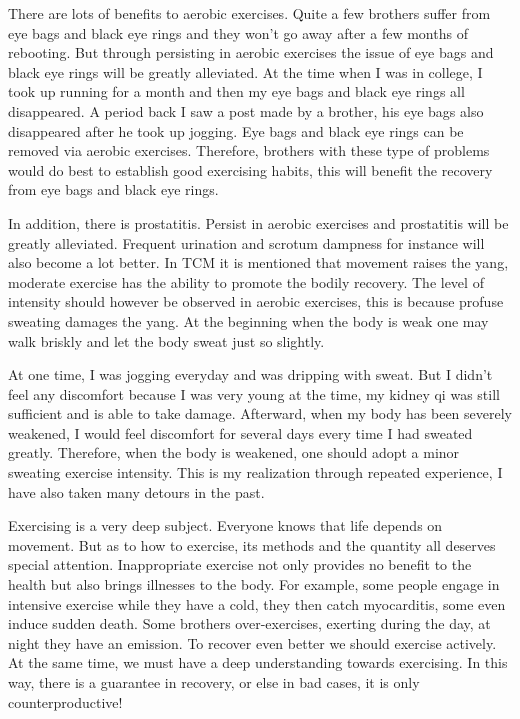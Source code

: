 \documentclass[
]{book}
\begin{document}
There are lots of benefits to aerobic exercises. Quite a few brothers suffer from eye bags and black eye rings and they won't go away after a few months of rebooting. But through persisting in aerobic exercises the issue of eye bags and black eye rings will be greatly alleviated. At the time when I was in college, I took up running for a month and then my eye bags and black eye rings all disappeared. A period back I saw a post made by a brother, his eye bags also disappeared after he took up jogging. Eye bags and black eye rings can be removed via aerobic exercises. Therefore, brothers with these type of problems would do best to establish good exercising habits, this will benefit the recovery from eye bags and black eye rings.

In addition, there is prostatitis. Persist in aerobic exercises and prostatitis will be greatly alleviated. Frequent urination and scrotum dampness for instance will also become a lot better. In TCM it is mentioned that movement raises the yang, moderate exercise has the ability to promote the bodily recovery. The level of intensity should however be observed in aerobic exercises, this is because profuse sweating damages the yang. At the beginning when the body is weak one may walk briskly and let the body sweat just so slightly.

At one time, I was jogging everyday and was dripping with sweat. But I didn't feel any discomfort because I was very young at the time, my kidney qi was still sufficient and is able to take damage. Afterward, when my body has been severely weakened, I would feel discomfort for several days every time I had sweated greatly. Therefore, when the body is weakened, one should adopt a minor sweating exercise intensity. This is my realization through repeated experience, I have also taken many detours in the past.

Exercising is a very deep subject. Everyone knows that life depends on movement. But as to how to exercise, its methods and the quantity all deserves special attention. Inappropriate exercise not only provides no benefit to the health but also brings illnesses to the body. For example, some people engage in intensive exercise while they have a cold, they then catch myocarditis, some even induce sudden death. Some brothers over-exercises, exerting during the day, at night they have an emission. To recover even better we should exercise actively. At the same time, we must have a deep understanding towards exercising. In this way, there is a guarantee in recovery, or else in bad cases, it is only counterproductive!
\end{document}
